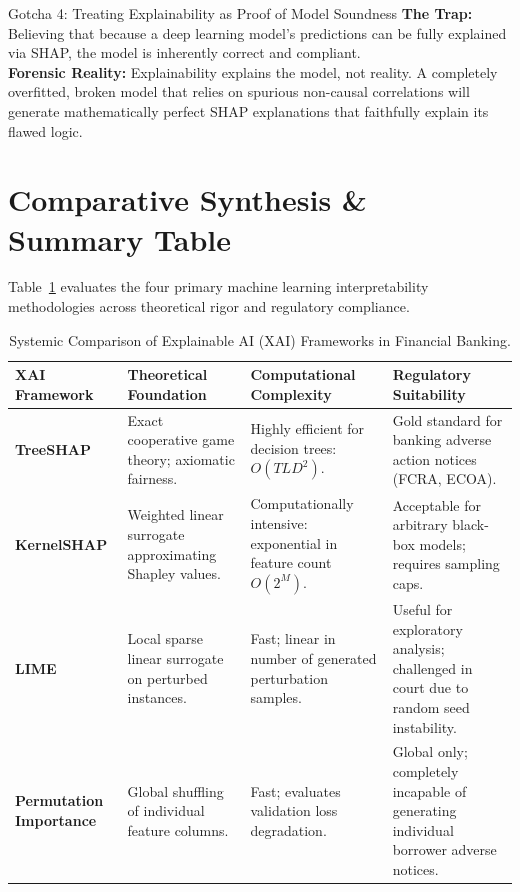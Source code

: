 \begin{trapbox}{Gotcha 4: Treating Explainability as Proof of Model Soundness}
\textbf{The Trap:} Believing that because a deep learning model's predictions can be fully explained via SHAP, the model is inherently correct and compliant.\\
\textbf{Forensic Reality:} Explainability explains the model, not reality. A completely overfitted, broken model that relies on spurious non-causal correlations will generate mathematically perfect SHAP explanations that faithfully explain its flawed logic.
\end{trapbox}

\section{Comparative Synthesis \& Summary Table}

Table~\ref{tab:comparison_xai_frameworks} evaluates the four primary machine learning interpretability methodologies across theoretical rigor and regulatory compliance.

\begin{table}[htbp]
\centering
\small
\begin{tabularx}{\textwidth}{lXXX}
\toprule
\textbf{XAI Framework} & \textbf{Theoretical Foundation} & \textbf{Computational Complexity} & \textbf{Regulatory Suitability} \\
\midrule
\textbf{TreeSHAP} & Exact cooperative game theory; axiomatic fairness. & Highly efficient for decision trees: $O(T L D^2)$. & Gold standard for banking adverse action notices (FCRA, ECOA). \\
\addlinespace
\textbf{KernelSHAP} & Weighted linear surrogate approximating Shapley values. & Computationally intensive: exponential in feature count $O(2^M)$. & Acceptable for arbitrary black-box models; requires sampling caps. \\
\addlinespace
\textbf{LIME} & Local sparse linear surrogate on perturbed instances. & Fast; linear in number of generated perturbation samples. & Useful for exploratory analysis; challenged in court due to random seed instability. \\
\addlinespace
\textbf{Permutation Importance} & Global shuffling of individual feature columns. & Fast; evaluates validation loss degradation. & Global only; completely incapable of generating individual borrower adverse notices. \\
\bottomrule
\end{tabularx}
\caption{Systemic Comparison of Explainable AI (XAI) Frameworks in Financial Banking.}
\label{tab:comparison_xai_frameworks}
\end{table}

